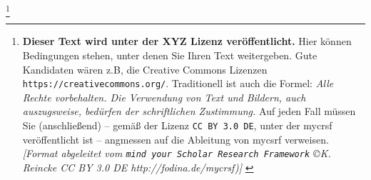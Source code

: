 %
%
%

\footnote{\textbf{Dieser Text wird unter der XYZ Lizenz veröffentlicht.}
Hier können Bedingungen stehen, unter denen Sie Ihren Text weitergeben.
Gute Kandidaten wären z.B, die Creative Commons Lizenzen
\texttt{https://creativecommons.org/}. Traditionell ist auch die Formel:
\emph{Alle Rechte vorbehalten. Die Verwendung von Text und Bildern, auch
auszugsweise, bedürfen der schriftlichen Zustimmung.} Auf jeden Fall müssen Sie
(anschließend) -- gemäß der Lizenz \texttt{CC BY 3.0 DE}, unter der mycrsf
veröffentlicht ist -- angmessen auf die Ableitung von mycsrf verweisen.
\newline 
{ \tiny \itshape [Format abgeleitet vom \texttt{mind your Scholar Research
Framework} \copyright K. Reincke CC BY 3.0 DE http://fodina.de/mycrsf)] }}

